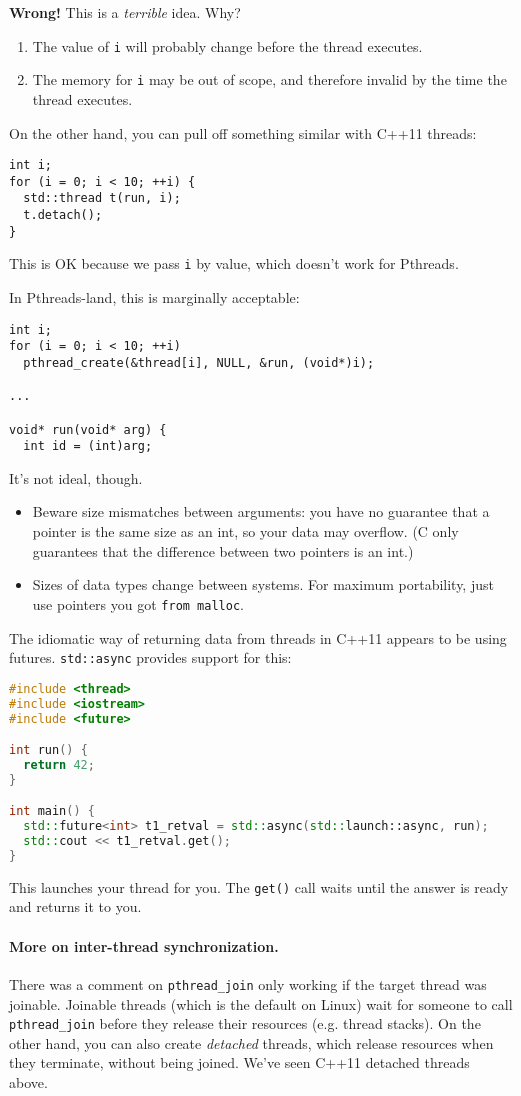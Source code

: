 \documentclass[11pt]{article}
\begin{document}
{\bf Wrong!} This is a \emph{terrible} idea. Why?
\begin{enumerate}
    \item The value of {\tt i} will probably change before the thread executes.
    \item The memory for {\tt i} may be out of scope, and therefore invalid by
          the time the thread executes.
\end{enumerate}
On the other hand, you can pull off something similar with C++11 threads:
\begin{lstlisting}
int i;
for (i = 0; i < 10; ++i) {
  std::thread t(run, i);
  t.detach();
}
\end{lstlisting}
This is OK because we pass {\tt i} by value, which doesn't work for Pthreads.

In Pthreads-land, this is marginally acceptable:
\begin{lstlisting}
int i;
for (i = 0; i < 10; ++i)
  pthread_create(&thread[i], NULL, &run, (void*)i);

...

void* run(void* arg) {
  int id = (int)arg;
\end{lstlisting}
It's not ideal, though.
  \begin{itemize}
    \item Beware size mismatches between arguments: you have
      no guarantee that a pointer is the same size as an int, so your data
      may overflow. (C only guarantees that the difference between two pointers is an int.)
    \item Sizes of data types change between systems. For maximum
      portability, just use pointers you got {\tt from malloc}.
  \end{itemize}

  The idiomatic way of returning data from threads in C++11 appears to be using
  futures. {\tt std::async} provides support for this:
\begin{lstlisting}[language=C++]
#include <thread>
#include <iostream>
#include <future>

int run() {
  return 42;
}

int main() {
  std::future<int> t1_retval = std::async(std::launch::async, run);
  std::cout << t1_retval.get();
}
\end{lstlisting}
This launches your thread for you. The {\tt get()} call waits until the answer
is ready and returns it to you.

\paragraph{More on inter-thread synchronization.} There was a comment on {\tt pthread\_join}
only working if the target thread was joinable. Joinable threads
(which is the default on Linux) wait for someone to call {\tt pthread\_join}
before they release their resources (e.g. thread stacks). On the other
hand, you can also create \emph{detached} threads, which release
resources when they terminate, without being joined. We've seen C++11 detached
threads above.
\end{document}
